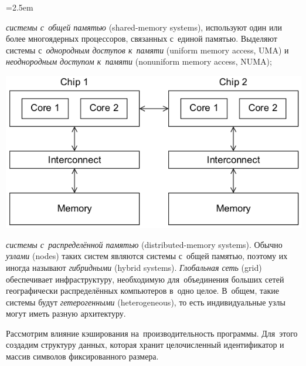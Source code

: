\medskip\noindent
\begin{minipage}[c]{0.5\textwidth}
\parindent=2.5em

\begin{itemfeature}
  \item \emph{системы с~общей памятью} (\textenglish{shared-memory systems}), используют один или более многоядерных процессоров, связанных с~единой памятью. Выделяют системы с~\emph{однородным доступов к~памяти} (\textenglish{uniform memory access, UMA}) и \emph{неоднородным доступом к~памяти} (\textenglish{nonuniform memory access, NUMA});
\end{itemfeature}

\end{minipage}\hfill\begin{minipage}{0.45\textwidth}

\includegraphics[width=\columnwidth]{images/numa_multicore_system.png}

\end{minipage}

\begin{itemfeature}
  \item \emph{системы с~распределённой памятью} (\textenglish{distributed-memory systems}). Обычно \emph{узлами} (\textenglish{nodes}) таких систем являются системы с~общей памятью, поэтому их иногда называют \emph{гибридными} (\textenglish{hybrid systems}). \emph{Глобальная сеть} (\textenglish{grid}) обеспечивает инфраструктуру, необходимую для~объединения больших сетей географически распределённых компьютеров в~одно целое. В~общем, такие системы будут \emph{гетерогенными} (\textenglish{heterogeneous}), то есть индивидуальные узлы могут иметь разную архитектуру.
\end{itemfeature}



\ExercisesSection
Рассмотрим влияние кэширования на~производительность программы. Для~этого создадим структуру данных, которая хранит целочисленный идентификатор и массив символов фиксированного размера.

